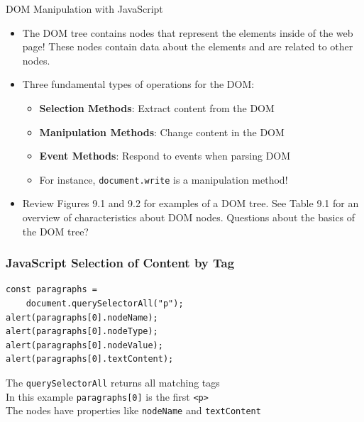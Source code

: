 \documentclass[14pt,aspectratio=169]{beamer}
\begin{document}
%
\begin{frame}{DOM Manipulation with JavaScript}
  \begin{itemize}
    \item The DOM tree contains nodes that represent the elements inside of the
      web page! These nodes contain data about the elements and are related to
      other nodes.
      \vspace*{-.15in}
    \item Three fundamental types of operations for the DOM:
      \begin{itemize}
        \item {\bf Selection Methods}: Extract content from the DOM
        \item {\bf Manipulation Methods}: Change content in the DOM
        \item {\bf Event Methods}: Respond to events when parsing DOM
        \item For instance, {\tt document.write} is a manipulation method!
      \end{itemize}
      \vspace*{-.25in}
    \item Review Figures 9.1 and 9.2 for examples of a DOM tree. See Table 9.1
      for an overview of characteristics about DOM nodes. Questions about
      the basics of the DOM tree?
  \end{itemize}
\end{frame}

%
\begin{frame}[fragile]
  \frametitle{JavaScript Selection of Content by Tag}
  \normalsize
  \begin{minipage}{6in}
    \vspace*{.1in}
    \begin{verbatim}
const paragraphs =
    document.querySelectorAll("p");
alert(paragraphs[0].nodeName);
alert(paragraphs[0].nodeType);
alert(paragraphs[0].nodeValue);
alert(paragraphs[0].textContent);
    \end{verbatim}
  \end{minipage}
  \vspace*{.1in}
  \begin{center}
    The {\tt querySelectorAll} returns all matching tags \\
    In this example {\tt paragraphs[0]} is the first {\tt <p>} \\
    The nodes have properties like {\tt nodeName} and {\tt textContent} \\
  \end{center}
\end{frame}
\end{document}
